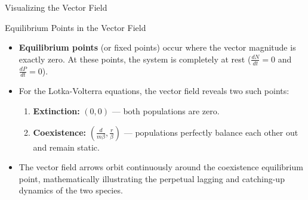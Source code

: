 \begin{frame}[fragile]{Visualizing the Vector Field}
    \begin{center}

    \end{center}
\end{frame}


\begin{frame}{Equilibrium Points in the Vector Field}
    \begin{itemize}
        \item \textbf{Equilibrium points} (or fixed points) occur where the vector magnitude is exactly zero. At these points, the system is completely at rest ($\frac{dN}{dt} = 0$ and $\frac{dP}{dt} = 0$).
        \pause
        \item For the Lotka-Volterra equations, the vector field reveals two such points:
        \begin{enumerate}
            \item \textbf{Extinction:} $(0, 0)$ --- both populations are zero.
            \pause
            \item \textbf{Coexistence:} $\left( \frac{d}{m\beta}, \frac{r}{\beta} \right)$ --- populations perfectly balance each other out and remain static.
        \end{enumerate}
        \pause
        \vspace{1em}
        \item The vector field arrows orbit continuously around the coexistence equilibrium point, mathematically illustrating the perpetual lagging and catching-up dynamics of the two species.
    \end{itemize}
\end{frame}


